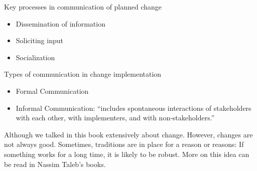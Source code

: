 \documentclass[
]{book}
\providecommand{\tightlist}{%
  \setlength{\itemsep}{0pt}\setlength{\parskip}{0pt}}
\begin{document}
Key processes in communication of planned change

\begin{itemize}
\tightlist
\item
  Dissemination of information\\
\item
  Soliciting input\\
\item
  Socialization
\end{itemize}

Types of communication in change implementation

\begin{itemize}
\tightlist
\item
  Formal Communication\\
\item
  Informal Communication: ``includes spontaneous interactions of stakeholders with each other, with implementers, and with non-stakeholders.''
\end{itemize}

Although we talked in this book extensively about change. However, changes are not always good. Sometimes, traditions are in place for a reason or reasons: If something works for a long time, it is likely to be robust. More on this idea can be read in Nassim Taleb's books.

\hypertarget{appendix-appendix}{%
\appendix}


  
\end{document}
